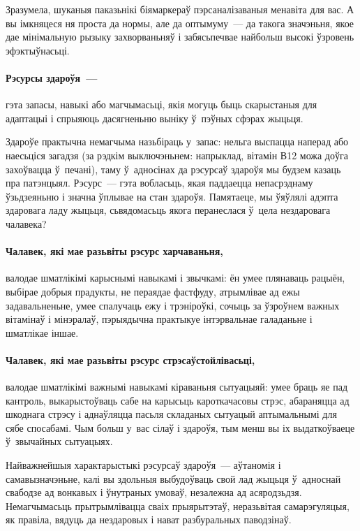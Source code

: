 Зразумела, шуканыя паказьнікі біямаркераў пэрсаналізаваныя менавіта для вас. А вы імкняцеся ня проста да нормы, але да оптымуму~--- да такога значэньня, якое дае мінімальную рызыку захворваньняў і забясьпечвае найбольш высокі ўзровень эфэктыўнасьці.

\paragraph{Рэсурсы здароўя~---} гэта запасы, навыкі або магчымасьці, якія могуць быць скарыстаныя для адаптацыі і спрыяюць дасягненьню выніку ў~пэўных сфэрах жыцьця.

Здароўе практычна немагчыма назьбіраць у~запас: нельга выспацца наперад або наесьціся загадзя (за рэдкім выключэньнем: напрыклад, вітамін В12 можа доўга захоўвацца ў~печані), таму ў~адносінах да рэсурсаў здароўя мы будзем казаць пра патэнцыял. Рэсурс~--- гэта вобласьць, якая паддаецца непасрэднаму ўзьдзеяньню і значна ўплывае на стан здароўя. Памятаеце, мы ўяўлялі адэпта здаровага ладу жыцьця, сьвядомасьць якога перанеслася ў~цела нездаровага чалавека?

\paragraph{Чалавек, які мае разьвіты рэсурс харчаваньня,} валодае шматлікімі карыснымі навыкамі і звычкамі: ён умее плянаваць рацыён, выбірае добрыя прадукты, не пераядае фастфуду, атрымлівае ад ежы задавальненьне, умее спалучаць ежу і трэніроўкі, сочыць за ўзроўнем важных вітамінаў і мінэралаў, пэрыядычна практыкуе інтэрвальнае галаданьне і шматлікае іншае.

\paragraph{Чалавек, які мае разьвіты рэсурс стрэсаўстойлівасьці,} валодае шматлікімі важнымі навыкамі кіраваньня сытуацыяй: умее браць яе пад кантроль, выкарыстоўваць сабе на карысьць кароткачасовы стрэс, абараняцца ад шкоднага стрэсу і аднаўляцца пасьля складаных сытуацый аптымальнымі для сябе спосабамі. Чым больш у~вас сілаў і здароўя, тым менш вы іх выдаткоўваеце ў~звычайных сытуацыях.

Найважнейшыя характарыстыкі рэсурсаў здароўя~--- аўтаномія і самавызначэньне, калі вы здольныя выбудоўваць свой лад жыцьця ў~адноснай свабодзе ад вонкавых і ўнутраных умоваў, незалежна ад асяродзьдзя. Немагчымасьць прытрымлівацца сваіх прыярытэтаў, неразьвітая самарэгуляцыя, як правіла, вядуць да нездаровых і нават разбуральных паводзінаў.


